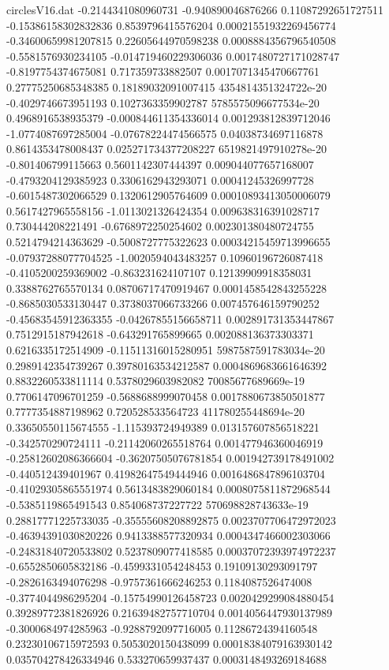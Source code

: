 \begin{filecontents}{circlesV16.dat}
-0.2144341080960731	-0.940890046876266	0.11087292651727511
-0.15386158302832836	0.8539796415576204	0.00021551932269456774
-0.34600659981207815	0.22605644970598238	0.0008884356796540508
-0.5581576930234105	-0.014719460229306036	0.0017480727171028747
-0.8197754374675081	0.717359733882507	0.0017071345470667761
0.27775250685348385	0.18189032091007415	4354814351324722e-20
-0.4029746673951193	0.1027363359902787	5785575096677534e-20
0.4968916538935379	-0.000844611354336014	0.001293812839712046
-1.0774087697285004	-0.07678224474566575	0.04038734697116878
0.8614353478008437	0.025271734377208227	6519821497910278e-20
-0.801406799115663	0.5601142307444397	0.009044077657168007
-0.4793204129385923	0.3306162943293071	0.00041245326997728
-0.6015487302066529	0.1320612905764609	0.00010893413050006079
0.5617427965558156	-1.0113021326424354	0.009638316391028717
0.730444208221491	-0.6768972250254602	0.002301380480724755
0.5214794214363629	-0.5008727775322623	0.00034215459713996655
-0.07937288077704525	-1.0020594043483257	0.10960196726087418
-0.4105200259369002	-0.863231624107107	0.12139909918358031
0.3388762765570134	0.08706717470919467	0.0001458542843255228
-0.8685030533130447	0.3738037066733266	0.007457646159790252
-0.45683545912363355	-0.04267855156658711	0.002891731353447867
0.7512915187942618	-0.643291765899665	0.002088136373303371
0.6216335172514909	-0.11511316015280951	5987587591783034e-20
0.2989142354739267	0.39780163534212587	0.0004869683661646392
0.8832260533811114	0.5378029603982082	70085677689669e-19
0.7706147096701259	-0.5688688999070458	0.0017880673850501877
0.7777354887198962	0.720528533564723	411780255448694e-20
0.33650550115674555	-1.115393724949389	0.013157607856518221
-0.342570290724111	-0.21142060265518764	0.001477946360046919
-0.25812602086366604	-0.36207505076781854	0.001942739178491002
-0.440512439401967	0.41982647549444946	0.0016486847896103704
-0.41029305865551974	0.5613483829060184	0.0008075811872968544
-0.5385119865491543	0.854068737227722	570698828743633e-19
0.28817771225733035	-0.35555608208892875	0.0023707706472972023
-0.46394391030820226	0.9413388577320934	0.0004347466002303066
-0.24831840720533802	0.5237809077418585	0.00037072393974972237
-0.6552850605832186	-0.4599331054248453	0.19109130293091797
-0.2826163494076298	-0.9757361666246253	0.1184087526474008
-0.3774044986295204	-0.15754990126458723	0.0020429299084880454
0.39289772381826926	0.21639482757710704	0.0014056447930137989
-0.3000684974285963	-0.9288792097716005	0.11286724394160548
0.23230106715972593	0.5053020150438099	0.00018384079163930142
0.035704278426334946	0.533270659937437	0.0003148493269184688

\end{filecontents}
